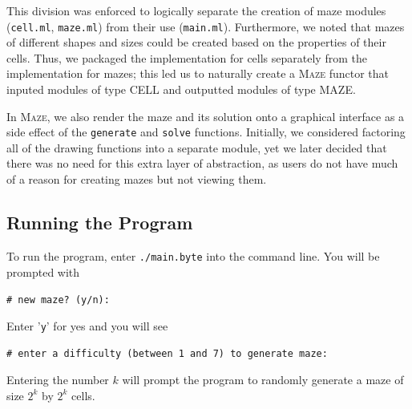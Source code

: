\documentclass[11pt, margin=1in]{article}
\newcommand{\tab}{\par \qquad}
\begin{document}
This division was enforced to logically separate the creation of maze modules (\texttt{cell.ml}, \texttt{maze.ml}) from their use (\texttt{main.ml}).  Furthermore, we noted that mazes of different shapes and sizes could be created based on the properties of their cells.  Thus, we packaged the implementation for cells separately from the implementation for mazes; this led us to naturally create a \textsc{Maze} functor that inputed modules of type \textsc{CELL} and outputted modules of type \textsc{MAZE}.
\tab In \textsc{Maze}, we also render the maze and its solution onto a graphical interface as a side effect of the \texttt{generate} and \texttt{solve} functions.  Initially, we considered factoring all of the drawing functions into a separate module, yet we later decided that there was no need for this extra layer of abstraction, as users do not have much of a reason for creating mazes but not viewing them.     

\subsection{Running the Program} %
To run the program, enter \texttt{./main.byte} into the command line.  You will be prompted with

\begin{flushleft}
\quad \quad \texttt{\# new maze? (y/n): } 
\end{flushleft}

Enter '\texttt{y}' for yes and you will see

\begin{flushleft}
\quad \quad \texttt{\# enter a difficulty (between 1 and 7) to generate maze:}
\end{flushleft}


Entering the number $k$ will prompt the program to randomly generate a maze of size $2^k$ by $2^k$ cells.  
\end{document}
